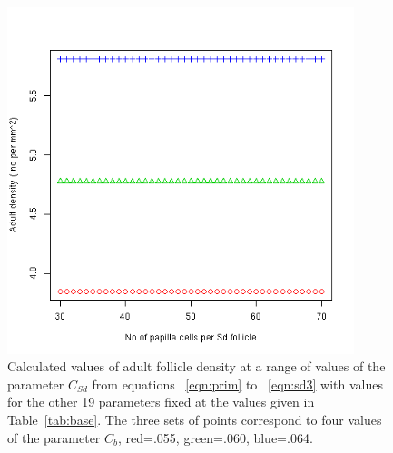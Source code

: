 %

\begin{figure}[!h]
  \centering
   \includegraphics[width=0.9\textwidth]{sdavecellnodens.png}
  \caption{Calculated values of adult follicle density at a range of values of the parameter $C_{Sd}$  from equations ~\ref{eqn:prim} to ~\ref{eqn:sd3} with values for the other 19  parameters fixed at the values given in Table~\ref{tab:base}. The three sets of points correspond to four values of the parameter $C_{b}$, red=.055, green=.060, blue=.064.}
  \label{fig:sdavecellnodens}
\end{figure}

%

